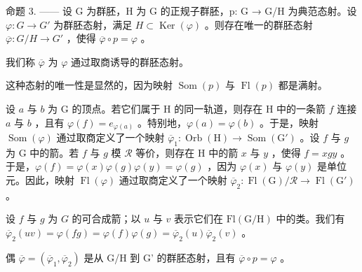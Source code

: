 命题 3. —— 设 G 为群胚，H 为 G 的正规子群胚，p: G → G/H 为典范态射。设 \(\varphi\colon G\to G'\) 为群胚态射，满足 \(H\subset\operatorname{Ker}(\varphi)\) 。则存在唯一的群胚态射 \(\overline{\varphi}\colon G/H\to G'\) ，使得 \(\overline{\varphi}\circ p=\varphi\) 。

我们称 \(\overline{\varphi}\) 为 \(\varphi\) 通过取商诱导的群胚态射。

这种态射的唯一性是显然的，因为映射 \(\operatorname{Som}(p)\) 与 \(\operatorname{Fl}(p)\) 都是满射。

设 \(a\) 与 \(b\) 为 G 的顶点。若它们属于 H 的同一轨道，则存在 H 中的一条箭 \(f\) 连接 \(a\) 与 \(b\) ，且有 \(\varphi(f) = e_{\varphi(a)}\) 。特别地，\(\varphi(a) = \varphi(b)\) 。于是，映射 \(\operatorname{Som}(\varphi)\) 通过取商定义了一个映射 \(\overline{\varphi}_1\colon \operatorname{Orb}(\mathrm{H}) \to \operatorname{Som}(\mathrm{G}')\) 。设 \(f\) 与 \(g\) 为 G 中的箭。若 \(f\) 与 \(g\) 模 \(\mathcal{R}\) 等价，则存在 H 中的箭 \(x\) 与 \(y\) ，使得 \(f = xgy\) 。于是，\(\varphi(f) = \varphi(x)\varphi(g)\varphi(y) = \varphi(g)\) ，因为 \(\varphi(x)\) 与 \(\varphi(y)\) 是单位元。因此，映射 \(\operatorname{Fl}(\varphi)\) 通过取商定义了一个映射 \(\overline{\varphi}_2\colon \operatorname{Fl}(\mathrm{G}) / \mathcal{R} \to \operatorname{Fl}(\mathrm{G}')\) 。

设 \(f\) 与 \(g\) 为 \(G\) 的可合成箭；以 \(u\) 与 \(v\) 表示它们在 \(\mathrm{Fl}(\mathrm{G} / \mathrm{H})\) 中的类。我们有 \(\overline{\varphi}_2(uv) = \varphi(fg) = \varphi(f)\varphi(g) = \overline{\varphi}_2(u)\overline{\varphi}_2(v)\) 。

偶 \(\overline{\varphi} = (\overline{\varphi}_1, \overline{\varphi}_2)\) 是从 G/H 到 G' 的群胚态射，且有 \(\overline{\varphi} \circ p = \varphi\) 。


